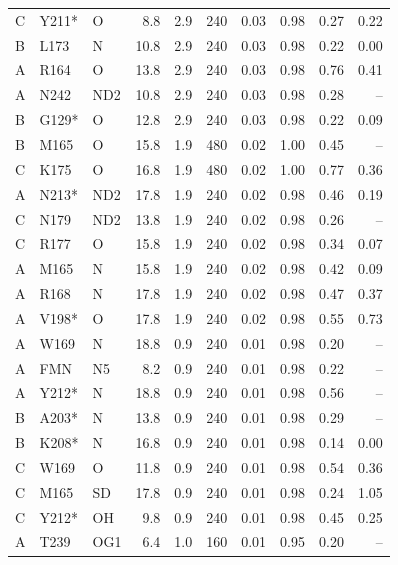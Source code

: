 \begin{table}[!htbp]
\begin{tabular}{lllrrrrrrr}
C & Y211* & O & 8.8 & 2.9 & 240 & 0.03 & 0.98 & 0.27 & 0.22\\
B & L173 & N & 10.8 & 2.9 & 240 & 0.03 & 0.98 & 0.22 & 0.00\\
A & R164 & O & 13.8 & 2.9 & 240 & 0.03 & 0.98 & 0.76 & 0.41\\
A & N242 & ND2 & 10.8 & 2.9 & 240 & 0.03 & 0.98 & 0.28 & --\\
B & G129* & O & 12.8 & 2.9 & 240 & 0.03 & 0.98 & 0.22 & 0.09\\
B & M165 & O & 15.8 & 1.9 & 480 & 0.02 & 1.00 & 0.45 & --\\
C & K175 & O & 16.8 & 1.9 & 480 & 0.02 & 1.00 & 0.77 & 0.36\\
A & N213* & ND2 & 17.8 & 1.9 & 240 & 0.02 & 0.98 & 0.46 & 0.19\\
C & N179 & ND2 & 13.8 & 1.9 & 240 & 0.02 & 0.98 & 0.26 & --\\
C & R177 & O & 15.8 & 1.9 & 240 & 0.02 & 0.98 & 0.34 & 0.07\\
A & M165 & N & 15.8 & 1.9 & 240 & 0.02 & 0.98 & 0.42 & 0.09\\
A & R168 & N & 17.8 & 1.9 & 240 & 0.02 & 0.98 & 0.47 & 0.37\\
A & V198* & O & 17.8 & 1.9 & 240 & 0.02 & 0.98 & 0.55 & 0.73\\
A & W169 & N & 18.8 & 0.9 & 240 & 0.01 & 0.98 & 0.20 & --\\
A & FMN & N5 & 8.2 & 0.9 & 240 & 0.01 & 0.98 & 0.22 & --\\
A & Y212* & N & 18.8 & 0.9 & 240 & 0.01 & 0.98 & 0.56 & --\\
B & A203* & N & 13.8 & 0.9 & 240 & 0.01 & 0.98 & 0.29 & --\\
B & K208* & N & 16.8 & 0.9 & 240 & 0.01 & 0.98 & 0.14 & 0.00\\
C & W169 & O & 11.8 & 0.9 & 240 & 0.01 & 0.98 & 0.54 & 0.36\\
C & M165 & SD & 17.8 & 0.9 & 240 & 0.01 & 0.98 & 0.24 & 1.05\\
C & Y212* & OH & 9.8 & 0.9 & 240 & 0.01 & 0.98 & 0.45 & 0.25\\
A & T239 & OG1 & 6.4 & 1.0 & 160 & 0.01 & 0.95 & 0.20 & --\\
\bottomrule\end{tabular}\end{table}
